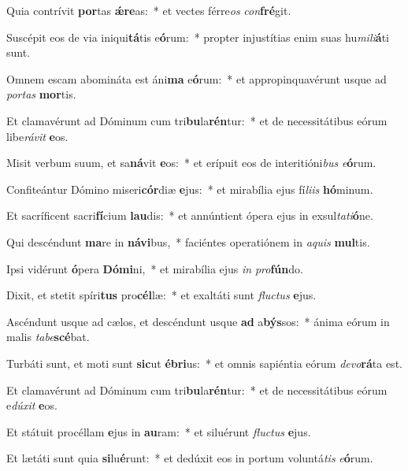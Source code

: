 \item Quia contrívit \textbf{por}tas \textbf{ǽ}\textbf{re}as:~* et vectes férre\textit{os} \textit{con}\textbf{fré}git.
\item Suscépit eos de via iniqui\textbf{tá}tis e\textbf{ó}rum:~* propter injustítias enim suas hu\textit{mi}\textit{li}\textbf{á}ti sunt.
\item Omnem escam abomináta est áni\textbf{ma} e\textbf{ó}rum:~* et appropinquavérunt usque ad \textit{por}\textit{tas} \textbf{mor}tis.
\item Et clamavérunt ad Dóminum cum tri\textbf{bu}la\textbf{rén}tur:~* et de necessitátibus eórum libe\textit{rá}\textit{vit} \textbf{e}os.
\item Misit verbum suum, et sa\textbf{ná}vit \textbf{e}os:~* et erípuit eos de interitióni\textit{bus} \textit{e}\textbf{ó}rum.
\item Confiteántur Dómino miseri\textbf{cór}diæ \textbf{e}jus:~* et mirabília ejus fí\textit{li}\textit{is} \textbf{hó}minum.
\item Et sacríficent sacri\textbf{fí}cium \textbf{lau}dis:~* et annúntient ópera ejus in exsul\textit{ta}\textit{ti}\textbf{ó}ne.
\item Qui descéndunt \textbf{ma}re in \textbf{ná}\textbf{vi}bus,~* faciéntes operatiónem in \textit{a}\textit{quis} \textbf{mul}tis.
\item Ipsi vidérunt \textbf{ó}pera \textbf{Dó}\textbf{mi}ni,~* et mirabília ejus \textit{in} \textit{pro}\textbf{fún}do.
\item Dixit, et stetit spíri\textbf{tus} pro\textbf{cél}læ:~* et exaltáti sunt \textit{fluc}\textit{tus} \textbf{e}jus.
\item Ascéndunt usque ad cælos, et descéndunt usque \textbf{ad} a\textbf{býs}sos:~* ánima eórum in malis \textit{ta}\textit{be}\textbf{scé}bat.
\item Turbáti sunt, et moti sunt \textbf{sic}ut \textbf{é}\textbf{bri}us:~* et omnis sapiéntia eórum \textit{de}\textit{vo}\textbf{rá}ta est.
\item Et clamavérunt ad Dóminum cum tri\textbf{bu}la\textbf{rén}tur:~* et de necessitátibus eórum e\textit{dú}\textit{xit} \textbf{e}os.
\item Et státuit procéllam \textbf{e}jus in \textbf{au}ram:~* et siluérunt \textit{fluc}\textit{tus} \textbf{e}jus.
\item Et lætáti sunt quia \textbf{si}lu\textbf{é}runt:~* et dedúxit eos in portum voluntá\textit{tis} \textit{e}\textbf{ó}rum.
